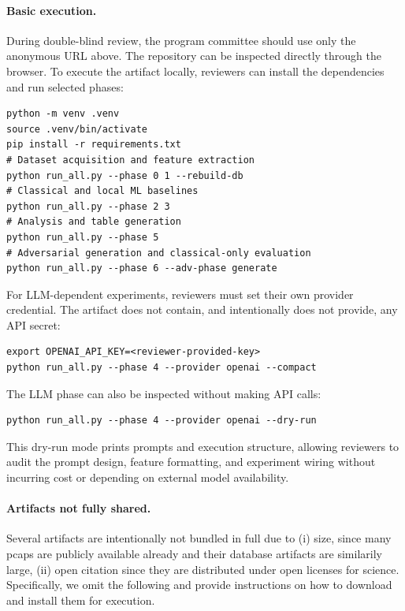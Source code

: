 \documentclass[conference]{IEEEtran}
\begin{document}
\paragraph{Basic execution.}
During double-blind review, the program committee should use only the anonymous URL above. The repository can be inspected directly through the browser. To execute the artifact locally, reviewers can install the dependencies and run selected phases:

\begin{lstlisting}[style=shellstyle_bw]
python -m venv .venv
source .venv/bin/activate
pip install -r requirements.txt
# Dataset acquisition and feature extraction
python run_all.py --phase 0 1 --rebuild-db
# Classical and local ML baselines
python run_all.py --phase 2 3
# Analysis and table generation
python run_all.py --phase 5
# Adversarial generation and classical-only evaluation
python run_all.py --phase 6 --adv-phase generate
\end{lstlisting}

For LLM-dependent experiments, reviewers must set their own provider credential. The artifact does not contain, and intentionally does not provide, any API secret:

\begin{lstlisting}[style=shellstyle_bw]
export OPENAI_API_KEY=<reviewer-provided-key>
python run_all.py --phase 4 --provider openai --compact
\end{lstlisting}

The LLM phase can also be inspected without making API calls:

\begin{lstlisting}[style=shellstyle_bw]
python run_all.py --phase 4 --provider openai --dry-run
\end{lstlisting}

This dry-run mode prints prompts and execution structure, allowing reviewers to audit the prompt design, feature formatting, and experiment wiring without incurring cost or depending on external model availability.

\paragraph{Artifacts not fully shared.}
Several artifacts are intentionally not bundled in full due to (i) size, since many pcaps are publicly available already and their database artifacts are similarily large, (ii) open citation since they are distributed under open licenses for science. Specifically, we omit the following and provide instructions on how to download and install them for execution.
\end{document}
